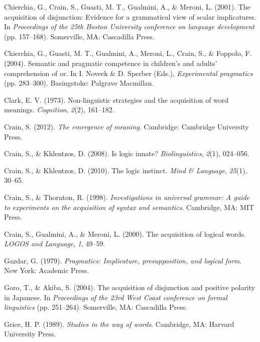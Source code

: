 \documentclass[floatsintext,man]{apa6}
\theoremstyle{definition}
\theoremstyle{definition}
\theoremstyle{definition}
\theoremstyle{remark}
\begin{document}
\hypertarget{ref-chierchia2001acquisition}{}
Chierchia, G., Crain, S., Guasti, M. T., Gualmini, A., \& Meroni, L.
(2001). The acquisition of disjunction: Evidence for a grammatical view
of scalar implicatures. In \emph{Proceedings of the 25th Boston
University conference on language development} (pp. 157--168).
Somerville, MA: Cascadilla Press.

\hypertarget{ref-chierchia2004semantic}{}
Chierchia, G., Guasti, M. T., Gualmini, A., Meroni, L., Crain, S., \&
Foppolo, F. (2004). Semantic and pragmatic competence in children's and
adults' comprehension of or. In I. Noveck \& D. Sperber (Eds.),
\emph{Experimental pragmatics} (pp. 283--300). Basingstoke: Palgrave
Macmillan.

\hypertarget{ref-clark1973non}{}
Clark, E. V. (1973). Non-linguistic strategies and the acquisition of
word meanings. \emph{Cognition}, \emph{2}(2), 161--182.

\hypertarget{ref-crain2012emergence}{}
Crain, S. (2012). \emph{The emergence of meaning}. Cambridge: Cambridge
University Press.

\hypertarget{ref-crain2008logic}{}
Crain, S., \& Khlentzos, D. (2008). Is logic innate?
\emph{Biolinguistics}, \emph{2}(1), 024--056.

\hypertarget{ref-crain2010logic}{}
Crain, S., \& Khlentzos, D. (2010). The logic instinct. \emph{Mind \&
Language}, \emph{25}(1), 30--65.

\hypertarget{ref-crain1998investigations}{}
Crain, S., \& Thornton, R. (1998). \emph{Investigations in universal
grammar: A guide to experiments on the acquisition of syntax and
semantics}. Cambridge, MA: MIT Press.

\hypertarget{ref-crain2000acquisition}{}
Crain, S., Gualmini, A., \& Meroni, L. (2000). The acquisition of
logical words. \emph{LOGOS and Language}, \emph{1}, 49--59.

\hypertarget{ref-gazdar79}{}
Gazdar, G. (1979). \emph{Pragmatics: Implicature, presupposition, and
logical form}. New York: Academic Press.

\hypertarget{ref-goro2004acquisition}{}
Goro, T., \& Akiba, S. (2004). The acquisition of disjunction and
positive polarity in Japanese. In \emph{Proceedings of the 23rd West
Coast conference on formal linguistics} (pp. 251--264). Somerville, MA:
Cascadilla Press.

\hypertarget{ref-grice1989studies}{}
Grice, H. P. (1989). \emph{Studies in the way of words}. Cambridge, MA:
Harvard University Press.
\end{document}
